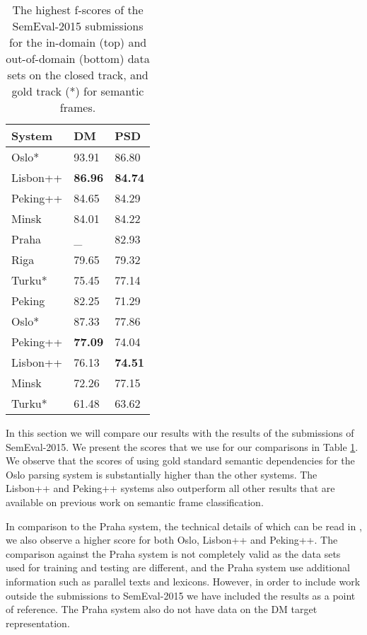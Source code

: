 \begin{table}
    \centering
    \smaller[0.2]
    \begin{tabular}{@{}lll@{}}
        \toprule
        \textbf{System} & \textbf{DM} & \textbf{PSD} \\
        \midrule
        Oslo* & 93.91 & 86.80\\
        Lisbon++ & \textbf{86.96} & \textbf{84.74} \\
        Peking++ & 84.65 & 84.29 \\
        Minsk & 84.01 & 84.22 \\
        Praha & \_ &  82.93\\
        Riga & 79.65 & 79.32\\
        Turku* & 75.45 & 77.14\\
        Peking & 82.25 & 71.29 \\
        \midrule
        Oslo* & 87.33 & 77.86\\
        Peking++ & \textbf{77.09} & 74.04 \\
        Lisbon++ & 76.13 & \textbf{74.51} \\
        Minsk & 72.26 & 77.15\\
        Turku* & 61.48 & 63.62\\
        \bottomrule
    \end{tabular}
    \caption{The highest f-scores of the SemEval-2015 submissions for the in-domain (top) and out-of-domain (bottom) data sets on the closed track, and gold track (*) for semantic frames.}
    \label{table:scores}
\end{table}

In this section we will compare our results with the results of the submissions of SemEval-2015. We present the scores that we use for our comparisons in Table \ref{table:scores}. We observe that the scores of using gold standard semantic dependencies for the Oslo parsing system is substantially higher than the other systems. The Lisbon++ and Peking++ systems also outperform all other results that are available on previous work on semantic frame classification.

In comparison to the Praha system, the technical details of which can be read in , we also observe a higher score for both Oslo, Lisbon++ and Peking++. The comparison against the Praha system is not completely valid as the data sets used for training and testing are different, and the Praha system use additional information such as parallel texts and lexicons. However, in order to include work outside the submissions to SemEval-2015 we have included the results as a point of reference. The Praha system also do not have data on the DM target representation.

